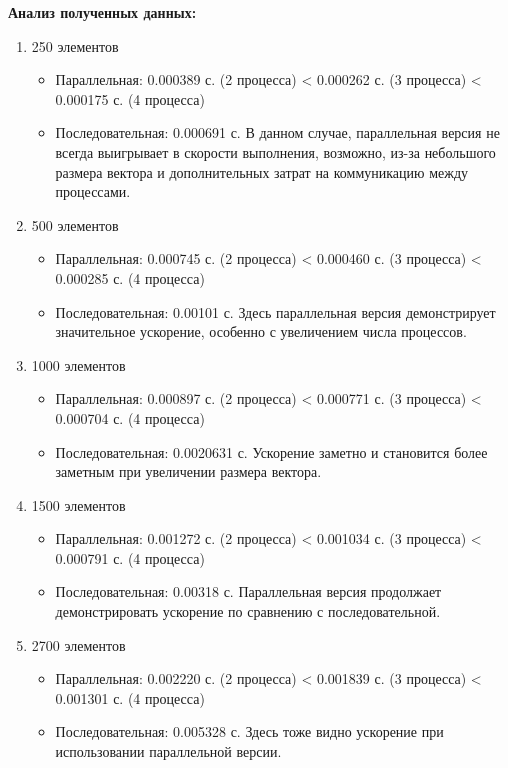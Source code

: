 \documentclass[a4paper, 14pt]{article}
\begin{document}
	
	\newpage
	\textbf{Анализ полученных данных:}
	\vspace{-0.65cm}
	\begin{enumerate}[leftmargin=3em]
		\item 250 элементов
		\begin{itemize}
			\setlength\itemsep{0cm}
			\item Параллельная: 0.000389 с. (2 процесса) < 0.000262 с. (3 процесса) < 0.000175 с. (4 процесса)
			\item Последовательная: 0.000691 с.
			В данном случае, параллельная версия не всегда выигрывает в скорости выполнения, возможно, из-за небольшого размера вектора и дополнительных затрат на коммуникацию между процессами.
		\end{itemize}
		
		\item 500 элементов
		\begin{itemize}
			\setlength\itemsep{0cm}
			\item Параллельная: 0.000745 с. (2 процесса) < 0.000460 с. (3 процесса) < 0.000285 с. (4 процесса)
			\item Последовательная: 0.00101 с.
			Здесь параллельная версия демонстрирует значительное ускорение, особенно с увеличением числа процессов.
		\end{itemize}
		
		\item 1000 элементов
		\begin{itemize}
			\setlength\itemsep{0cm}
			\item Параллельная: 0.000897 с. (2 процесса) < 0.000771 с. (3 процесса) < 0.000704 с. (4 процесса)
			\item Последовательная: 0.0020631 с.
			Ускорение заметно и становится более заметным при увеличении размера вектора.
		\end{itemize}
		
		\item 1500 элементов
		\begin{itemize}
			\setlength\itemsep{0cm}
			\item Параллельная: 0.001272 с. (2 процесса) < 0.001034 с. (3 процесса) < 0.000791 с. (4 процесса)
			\item Последовательная: 0.00318 с.
			Параллельная версия продолжает демонстрировать ускорение по сравнению с последовательной.
		\end{itemize}
		
		\item 2700 элементов
		\begin{itemize}
			\setlength\itemsep{0cm}
			\item Параллельная: 0.002220 с. (2 процесса) < 0.001839 с. (3 процесса) < 0.001301 с. (4 процесса)
			\item Последовательная: 0.005328 с.
			Здесь тоже видно ускорение при использовании параллельной версии.
		\end{itemize}
	\end{enumerate}
	
\end{document}
